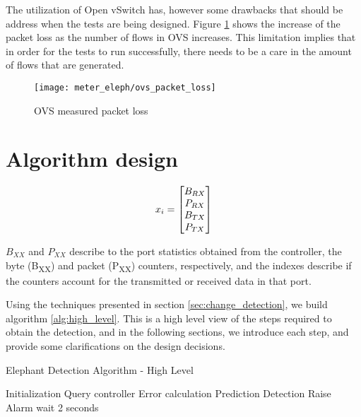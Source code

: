 \par The utilization of Open vSwitch has, however some drawbacks that should be address when the tests are being designed. Figure \ref{fig:ovs_packet_loss} shows
the increase of the packet loss as the number of flows in OVS increases. This limitation implies that in order for the tests to run successfully, there needs to be
a care in the amount of flows that are generated.

\begin{figure} [H]
    \centering
    \texttt{[image: meter\_eleph/ovs\_packet\_loss]}
    \caption {OVS measured packet loss}
    \label{fig:ovs_packet_loss}
\end{figure} 

\section {Algorithm design}

\begin {equation*}
    \centering
    x_i = 
    \begin{bmatrix}
    B_{RX}\\
    P_{RX}\\
    B_{TX}\\
    P_{TX}\\
    \end{bmatrix}
\end {equation*}

\par $B_{XX}$ and $P_{XX}$ describe to the port statistics obtained from the controller, the byte (B\textsubscript{XX}) and packet (P\textsubscript{XX}) counters, 
respectively, and the indexes describe if the counters account for the transmitted or received data in that port.

\par Using the techniques presented in section \ref{sec:change_detection}, we build algorithm \ref{alg:high_level}. This is a high level view of the steps
required to obtain the detection, and in the following sections, we introduce each step, and provide some clarifications on the design decisions.

\begin{algorithm}[H]
    \caption{Elephant Detection Algorithm - High Level} \label{alg:high_level}
    \begin{algorithmic}[1]
            \State Initialization
            \State Query controller
            \Loop
                \State Error calculation
                \State Prediction
                \State Detection
                    \State Raise Alarm
                \EndIf
                \State wait 2 seconds
            \EndLoop
        \EndProcedure 
       \end{algorithmic}
\end{algorithm}

